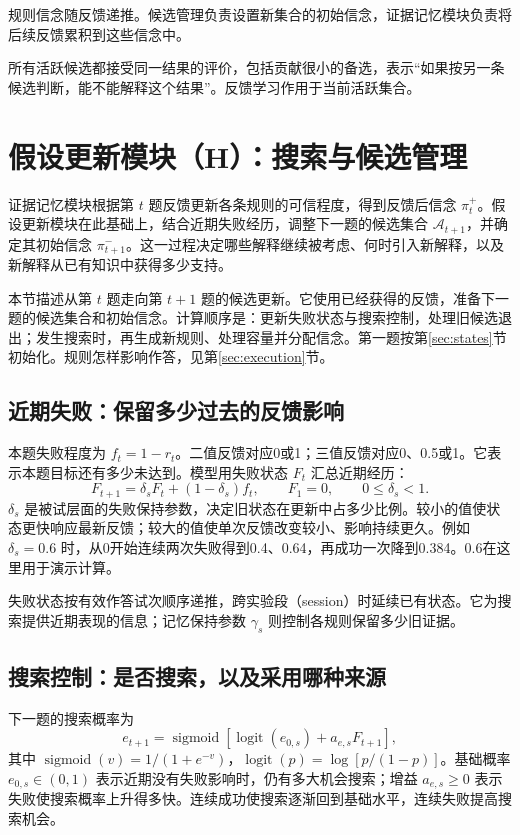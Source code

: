 \documentclass[12pt]{article}
\newcommand{\logit}{\operatorname{logit}}
\newcommand{\sigmoid}{\operatorname{sigmoid}}
\begin{document}
规则信念随反馈递推。候选管理负责设置新集合的初始信念，证据记忆模块负责将后续反馈累积到这些信念中。

所有活跃候选都接受同一结果的评价，包括贡献很小的备选，表示“如果按另一条候选判断，能不能解释这个结果”。反馈学习作用于当前活跃集合。

\section{假设更新模块（H）：搜索与候选管理}
\label{sec:hypothesis}

证据记忆模块根据第 $t$ 题反馈更新各条规则的可信程度，得到反馈后信念 $\pi_t^+$。假设更新模块在此基础上，结合近期失败经历，调整下一题的候选集合 $\mathcal A_{t+1}$，并确定其初始信念 $\pi_{t+1}^-$。这一过程决定哪些解释继续被考虑、何时引入新解释，以及新解释从已有知识中获得多少支持。

本节描述从第 $t$ 题走向第 $t+1$ 题的候选更新。它使用已经获得的反馈，准备下一题的候选集合和初始信念。计算顺序是：更新失败状态与搜索控制，处理旧候选退出；发生搜索时，再生成新规则、处理容量并分配信念。第一题按第\ref{sec:states}节初始化。规则怎样影响作答，见第\ref{sec:execution}节。

\subsection{近期失败：保留多少过去的反馈影响}
\label{sec:search}

本题失败程度为 $f_t=1-r_t$。二值反馈对应0或1；三值反馈对应0、0.5或1。它表示本题目标还有多少未达到。模型用失败状态 $F_t$ 汇总近期经历：
\begin{equation}
F_{t+1}=\delta_sF_t+(1-\delta_s)f_t,\qquad
F_1=0,\qquad 0\leq\delta_s<1.
\label{eq:failure}
\end{equation}
$\delta_s$ 是被试层面的失败保持参数，决定旧状态在更新中占多少比例。较小的值使状态更快响应最新反馈；较大的值使单次反馈改变较小、影响持续更久。例如 $\delta_s=0.6$ 时，从0开始连续两次失败得到0.4、0.64，再成功一次降到0.384。0.6在这里用于演示计算。

失败状态按有效作答试次顺序递推，跨实验段（session）时延续已有状态。它为搜索提供近期表现的信息；记忆保持参数 $\gamma_s$ 则控制各规则保留多少旧证据。

\subsection{搜索控制：是否搜索，以及采用哪种来源}

下一题的搜索概率为
\begin{equation}
e_{t+1}=\sigmoid[\logit(e_{0,s})+a_{e,s}F_{t+1}],
\label{eq:search-probability}
\end{equation}
其中 $\sigmoid(v)=1/(1+e^{-v})$，$\logit(p)=\log[p/(1-p)]$。基础概率 $e_{0,s}\in(0,1)$ 表示近期没有失败影响时，仍有多大机会搜索；增益 $a_{e,s}\geq0$ 表示失败使搜索概率上升得多快。连续成功使搜索逐渐回到基础水平，连续失败提高搜索机会。
\end{document}
